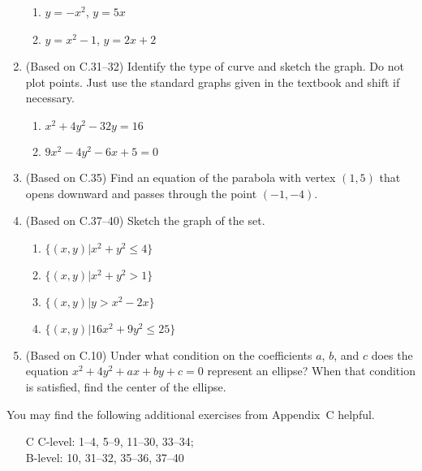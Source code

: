\documentclass[11pt]{article}
\newcommand{\ds}{\displaystyle}
\begin{document}
\begin{enumerate}
\begin{multicols}{2}
\begin{enumerate}
  \item $\ds y=-x^2$, $y=5x$
  \item $\ds y=x^2-1$, $y=2x+2$
  \end{enumerate}
  \end{multicols}
\item (Based on C.31--32) Identify the type of curve and sketch the graph.
  Do not plot points.  Just use the standard graphs given in the textbook
  and shift if necessary.
  \begin{multicols}{2}
  \begin{enumerate}
  \item $\ds x^2+4y^2-32y=16$
  \item $\ds 9x^2-4y^2-6x+5=0$
  \end{enumerate}
  \end{multicols}
\item (Based on C.35) Find an equation of the parabola with vertex $(1,5)$
  that opens downward and passes through the point $(-1,-4)$.
\item (Based on C.37--40) Sketch the graph of the set.
  \begin{multicols}{2}
  \begin{enumerate}
  \item $\ds \{(x,y)|x^2+y^2\le 4\}$
  \item $\ds \{(x,y)|x^2+y^2>1\}$
  \item $\ds \{(x,y)|y>x^2-2x\}$
  \item $\ds \{(x,y)|16x^2+9y^2\le 25\}$
  \end{enumerate}
  \end{multicols}
\item (Based on C.10) Under what condition on the coefficients $a$, $b$, and
  $c$ does the equation $x^2+4y^2+ax+by+c=0$ represent an ellipse?  When
  that condition is satisfied, find the center of the ellipse.
\end{enumerate}

\noindent
You may find the following additional exercises from Appendix~C helpful.
\begin{itemize}
\item[C] 
  C-level: 1--4, 5--9, 11--30, 33--34; \\
  B-level: 10, 31--32, 35--36, 37--40
\end{itemize}
\end{document}
